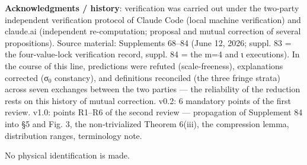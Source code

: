 \documentclass[
]{ltjsarticle}
\begin{document}
\textbf{Acknowledgments / history}: verification was carried out under
the two-party independent verification protocol of Claude Code (local
machine verification) and claude.ai (independent re-computation;
proposal and mutual correction of several propositions). Source
material: Supplements 68--84 (June 12, 2026; suppl. 83 = the
four-value-lock verification record, suppl. 84 = the m=4 and ι
executions). In the course of this line, predictions were refuted
(scale-freeness), explanations corrected (σ\(_{0}\) constancy), and
definitions reconciled (the three fringe strata) across seven exchanges
between the two parties --- the reliability of the reduction rests on
this history of mutual correction. v0.2: 6 mandatory points of the first
review. v1.0: points R1--R6 of the second review --- propagation of
Supplement 84 into §5 and Fig. 3, the non-trivialized Theorem 6(iii),
the compression lemma, distribution ranges, terminology note.

No physical identification is made.
\end{document}
